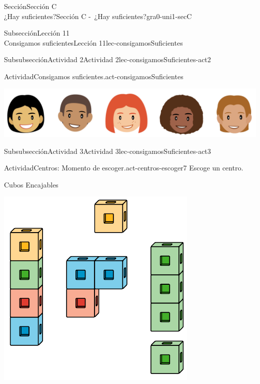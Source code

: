 \begin{sectionptx}{Sección}{{\Large Sección C\\}¿Hay suficientes?}{}{Sección C -~¿Hay suficientes?}{}{}{gra0-uni1-secC}
\begin{subsectionptx}{Subsección}{{\normalsize Lección 11\\[-0.05cm]}Consigamos suficientes}{}{Lección 11}{}{}{lec-consigamosSuficientes}
\begin{subsubsectionptx}{Subsubsección}{Actividad 2}{}{Actividad 2}{}{}{lec-consigamosSuficientes-act2}
\begin{activity}{Actividad}{Consigamos suficientes.}{act-consigamosSuficientes}%
\begin{image}{0.0}{1}{0.0}{}%
\includegraphics[max width=\linewidth, center]{external/png-source/K.1 Revisions.StudentFacesInARow.png}
\end{image}%
\end{activity}%
\end{subsubsectionptx}
%
%
\typeout{************************************************}
\typeout{************************************************}
%
\clearpage
\begin{subsubsectionptx}{Subsubsección}{Actividad 3}{}{Actividad 3}{}{}{lec-consigamosSuficientes-act3}
\begin{activity}{Actividad}{Centros: Momento de escoger.}{act-centros-escoger7}%
Escoge un centro.%
\begin{sidebyside}{2}{0.025}{0.025}{0.05}%
\begin{sbspanel}{0.45}%
Cubos Encajables%
\par
\includegraphics[max width=\linewidth, center]{external/svg-source/tikz-file-128850.pdf}

\end{sbspanel}
\end{sidebyside}
\end{activity}
\end{subsubsectionptx}
\end{subsectionptx}
\end{sectionptx}
